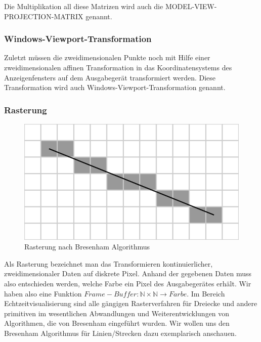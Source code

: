 Die Multiplikation all diese Matrizen wird auch die MODEL-VIEW-PROJECTION-MATRIX genannt. 

\subsubsection*{Windows-Viewport-Transformation}
Zuletzt müssen die zweidimensionalen Punkte noch mit Hilfe einer 
zweidimensionalen affinen Transformation in das Koordinatensystems des 
Anzeigenfensters auf dem Ausgabegerät transformiert werden. 
Diese Transformation wird auch Windows-Viewport-Transformation genannt.

\subsubsection{Rasterung}
\begin{figure}[H]
    \centering
    \includegraphics[width=1.0\textwidth]{images/bresenham.png}
    \caption{Rasterung nach Bresenham Algorithmus}
    \label{fig:screening-bresenham-line}
\end{figure}
Als Rasterung bezeichnet man das Transformieren kontinuierlicher, 
zweidimensionaler Daten auf diskrete Pixel. 
Anhand der gegebenen Daten muss also entschieden werden, welche Farbe ein Pixel des Ausgabegerätes erhält.
Wir haben also eine Funktion 
$Frame-Buffer: \mathbb{N} \times \mathbb{N} \to Farbe$. 
Im Bereich Echtzeitvisualisierung sind alle gängigen Rasterverfahren für 
Dreiecke und andere primitiven im wesentlichen Abwandlungen und 
Weiterentwicklungen von Algorithmen, die von Bresenham eingeführt wurden. 
Wir wollen uns den Bresenham Algorithmus für Linien/Strecken dazu exemplarisch 
anschauen.

